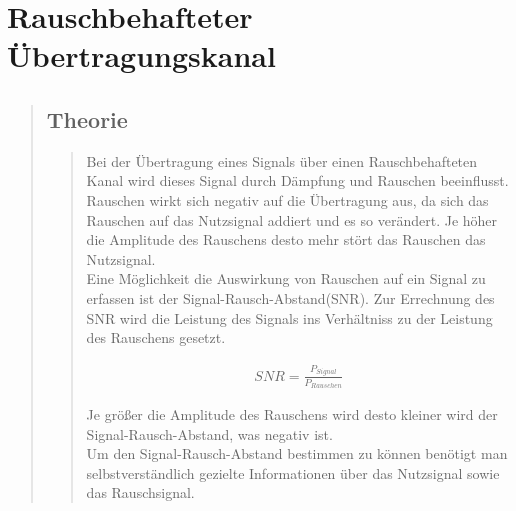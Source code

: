 \section{Rauschbehafteter Übertragungskanal}
\begin{quote}
	\subsection{Theorie}
    \begin{quote}
        Bei der Übertragung eines Signals über einen Rauschbehafteten Kanal wird dieses Signal durch Dämpfung und
        Rauschen beeinflusst. Rauschen wirkt sich negativ auf die Übertragung aus, da sich das Rauschen auf das
        Nutzsignal addiert und es so verändert. Je höher die Amplitude des Rauschens desto mehr stört das Rauschen
        das Nutzsignal.\\
        Eine Möglichkeit die Auswirkung von Rauschen auf ein Signal zu erfassen ist der
        Signal-Rausch-Abstand(SNR).
        Zur Errechnung des SNR wird die Leistung des Signals ins Verhältniss zu der Leistung des Rauschens gesetzt.
        
        \begin{equation*}
        	\begin{split}
        		SNR = \frac{P_{Signal}}{P_{Rauschen}}
        	\end{split}
        \end{equation*}
        
        Je größer die Amplitude des Rauschens wird desto kleiner wird der Signal-Rausch-Abstand, was negativ ist.\\
        Um den Signal-Rausch-Abstand bestimmen zu können benötigt man selbstverständlich gezielte Informationen über das
        Nutzsignal sowie das Rauschsignal. 
    \end{quote}
    

\end{quote}
